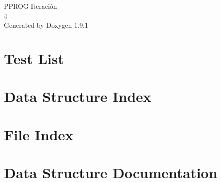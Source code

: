 \let\mypdfximage\pdfximage\def\pdfximage{\immediate\mypdfximage}\documentclass[twoside]{book}
\newcommand{\+}{\discretionary{\mbox{\scriptsize$\hookleftarrow$}}{}{}}
\newcommand{\clearemptydoublepage}{%
  \newpage{\pagestyle{empty}\cleardoublepage}%
}
\begin{document}
\raggedbottom

\hypersetup{pageanchor=false,
             bookmarksnumbered=true,
             pdfencoding=unicode
            }
\begin{titlepage}
\vspace*{7cm}
\begin{center}%
{\Large PPROG Iteración \\[1ex]\large 4 }\\
\vspace*{1cm}
{\large Generated by Doxygen 1.9.1}\\
\end{center}
\end{titlepage}
\clearemptydoublepage
{}
\tableofcontents
\clearemptydoublepage
{}
\hypersetup{pageanchor=true}

\chapter{Test List}
\label{test}

\chapter{Data Structure Index}

\chapter{File Index}

\chapter{Data Structure Documentation}














\end{document}
